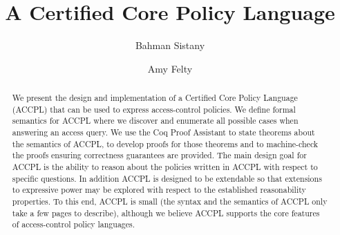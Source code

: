 \documentclass[runningheads,a4paper]{llncs}
\begin{document}


\title{A Certified Core Policy Language}

\author{Bahman Sistany \and Amy Felty}

%
\iffalse
\author{Firstname Lastname\inst{1} \and Firstname Lastname\inst{2} }

\institute{
Insitute 1\\
\email{...}\and
Insitute 2\\
\email{...}
}
\fi
			
\maketitle

\begin{abstract}
We present the design and implementation of a Certified Core Policy Language (ACCPL) that can be used to express access-control policies. We define formal semantics for ACCPL where we discover and enumerate all possible cases when answering an access query. We use the Coq Proof Assistant to state theorems about the semantics of ACCPL, to develop proofs for those theorems and to machine-check the proofs ensuring correctness guarantees are provided. The main design goal for ACCPL is the ability to reason about the policies written in ACCPL with respect to specific questions. In addition ACCPL is designed to be extendable so that extensions to expressive power may be explored with respect to the established reasonability properties.  To this end, ACCPL is small (the syntax and the semantics of ACCPL only take a few pages to describe), although we believe ACCPL supports the core features of access-control policy languages.
\end{abstract}

\end{document}
